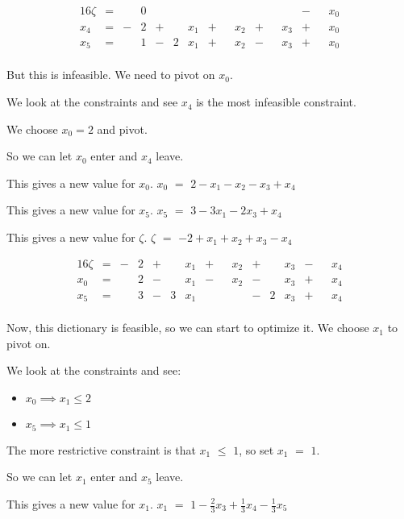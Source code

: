 \documentclass[12pt,letterpaper]{article}
\newcommand*\enterleave[2]{
  So we can let #1 enter and #2 leave.
}
\newcommand*\morerestrictive[2]{
  The more restrictive constraint is that #1 $\leq$ #2, so set #1 $=$ #2.
}
\newcommand*\newvalue[2]{
  This gives a new value for #1. #1 $ = $ #2
}
\begin{document}
\begin{enumerate}
      \begin{alignat*}{16}
        \zeta & {}={} &       & 0 &       &   &     &       &   &     &       &   &     & {}-{} &   & x_0 \\
        x_4   & {}={} & {}-{} & 2 & {}+{} &   & x_1 & {}+{} &   & x_2 & {}+{} &   & x_3 & {}+{} &   & x_0 \\
        x_5   & {}={} &       & 1 & {}-{} & 2 & x_1 & {}+{} &   & x_2 & {}-{} &   & x_3 & {}+{} &   & x_0 \\
      \end{alignat*}

      But this is infeasible.
      We need to pivot on $x_0$.

      We look at the constraints and see $x_4$ is the most infeasible constraint.

      We choose $x_0 = 2$ and pivot.

      \enterleave{$x_0$}{$x_4$}

      \newvalue{$x_0$}{$2 - x_1 - x_2 - x_3 + x_4$}

      \newvalue{$x_5$}{$3 - 3x_1 - 2x_3 + x_4$}

      \newvalue{$\zeta$}{$-2 + x_1 + x_2 + x_3 - x_4$}

      \begin{alignat*}{16}
        \zeta & {}={} & {}-{} & 2 & {}+{} &   & x_1 & {}+{} &   & x_2 & {}+{} &   & x_3 & {}-{} &   & x_4 \\
        x_0   & {}={} &       & 2 & {}-{} &   & x_1 & {}-{} &   & x_2 & {}-{} &   & x_3 & {}+{} &   & x_4 \\
        x_5   & {}={} &       & 3 & {}-{} & 3 & x_1 &       &   &     & {}-{} & 2 & x_3 & {}+{} &   & x_4 \\
      \end{alignat*}

      Now, this dictionary is feasible, so we can start to optimize it.
      We choose $x_1$ to pivot on.

      We look at the constraints and see:
      \begin{itemize}
        \item $x_0 \implies x_1 \leq 2$
        \item $x_5 \implies x_1 \leq 1$
      \end{itemize}

      \morerestrictive{$x_1$}{$1$}

      \enterleave{$x_1$}{$x_5$}

      \newvalue{$x_1$}{$1 - \frac{2}{3}x_3 + \frac{1}{3}x_4 - \frac{1}{3}x_5$}


\end{enumerate}
\end{document}

